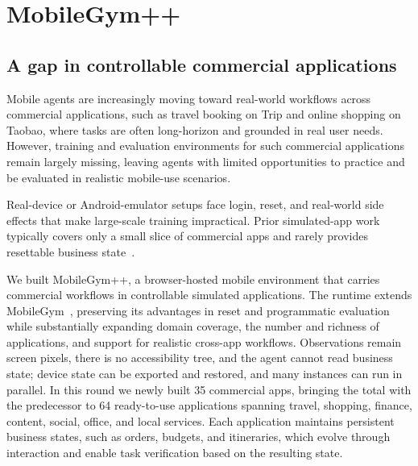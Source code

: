 
\section{MobileGym++}
\label{sec:mobilegym++}
\label{sec:method}

\subsection{A gap in controllable commercial applications}
\label{sec:mgpp-env}

Mobile agents are increasingly moving toward real-world workflows across commercial applications, such as travel booking on Trip and online shopping on Taobao, where tasks are often long-horizon and grounded in real user needs. However, training and evaluation environments for such commercial applications remain largely missing, leaving agents with limited opportunities to practice and be evaluated in realistic mobile-use scenarios.

Real-device or Android-emulator setups face login, reset, and real-world side effects that make large-scale training impractical. Prior simulated-app work typically covers only a small slice of commercial apps and rarely provides resettable business state~\citep{rawles2025androidworld,kong2025mobileworld}.

We built MobileGym++, a browser-hosted mobile environment that carries commercial workflows in controllable simulated applications. The runtime extends MobileGym~\citep{wu2026mobilegym}, preserving its advantages in reset and programmatic evaluation while substantially expanding domain coverage, the number and richness of applications, and support for realistic cross-app workflows. Observations remain screen pixels, there is no accessibility tree, and the agent cannot read business state; device state can be exported and restored, and many instances can run in parallel. In this round we newly built 35 commercial apps, bringing the total with the predecessor to 64 ready-to-use applications spanning travel, shopping, finance, content, social, office, and local services. Each application maintains persistent business states, such as orders, budgets, and itineraries, which evolve through interaction and enable task verification based on the resulting state.

